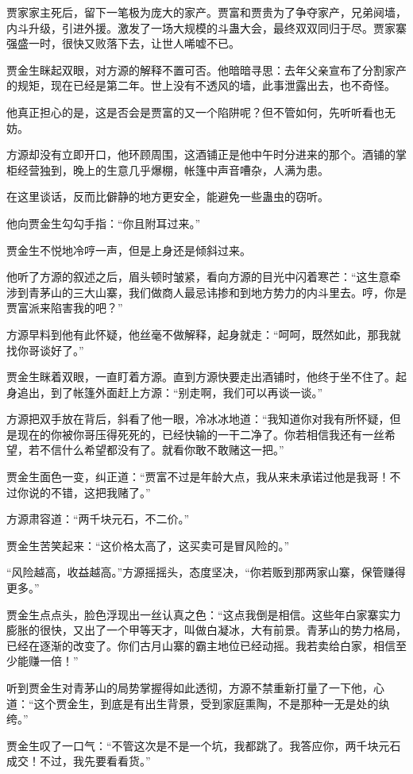 \begin{this_body}
贾家家主死后，留下一笔极为庞大的家产。贾富和贾贵为了争夺家产，兄弟阋墙，内斗升级，引进外援。激发了一场大规模的斗蛊大会，最终双双同归于尽。贾家寨强盛一时，很快又败落下去，让世人唏嘘不已。

贾金生眯起双眼，对方源的解释不置可否。他暗暗寻思：去年父亲宣布了分割家产的规矩，现在已经是第二年。世上没有不透风的墙，此事泄露出去，也不奇怪。

他真正担心的是，这是否会是贾富的又一个陷阱呢？但不管如何，先听听看也无妨。

方源却没有立即开口，他环顾周围，这酒铺正是他中午时分进来的那个。酒铺的掌柜经营独到，晚上的生意几乎爆棚，帐篷中声音嘈杂，人满为患。

在这里谈话，反而比僻静的地方更安全，能避免一些蛊虫的窃听。

他向贾金生勾勾手指：“你且附耳过来。”

贾金生不悦地冷哼一声，但是上身还是倾斜过来。

他听了方源的叙述之后，眉头顿时皱紧，看向方源的目光中闪着寒芒：“这生意牵涉到青茅山的三大山寨，我们做商人最忌讳掺和到地方势力的内斗里去。哼，你是贾富派来陷害我的吧？”

方源早料到他有此怀疑，他丝毫不做解释，起身就走：“呵呵，既然如此，那我就找你哥谈好了。”

贾金生眯着双眼，一直盯着方源。直到方源快要走出酒铺时，他终于坐不住了。起身追出，到了帐篷外面赶上方源：“别走啊，我们可以再谈一谈。”

方源把双手放在背后，斜看了他一眼，冷冰冰地道：“我知道你对我有所怀疑，但是现在的你被你哥压得死死的，已经快输的一干二净了。你若相信我还有一丝希望，若不信什么希望都没有了。就看你敢不敢赌这一把。”

贾金生面色一变，纠正道：“贾富不过是年龄大点，我从来未承诺过他是我哥！不过你说的不错，这把我赌了。”

方源肃容道：“两千块元石，不二价。”

贾金生苦笑起来：“这价格太高了，这买卖可是冒风险的。”

“风险越高，收益越高。”方源摇摇头，态度坚决，“你若贩到那两家山寨，保管赚得更多。”

贾金生点点头，脸色浮现出一丝认真之色：“这点我倒是相信。这些年白家寨实力膨胀的很快，又出了一个甲等天才，叫做白凝冰，大有前景。青茅山的势力格局，已经在逐渐的改变了。你们古月山寨的霸主地位已经动摇。我若卖给白家，相信至少能赚一倍！”

听到贾金生对青茅山的局势掌握得如此透彻，方源不禁重新打量了一下他，心道：“这个贾金生，到底是有出生背景，受到家庭熏陶，不是那种一无是处的纨绔。”

贾金生叹了一口气：“不管这次是不是一个坑，我都跳了。我答应你，两千块元石成交！不过，我先要看看货。”


\end{this_body}
